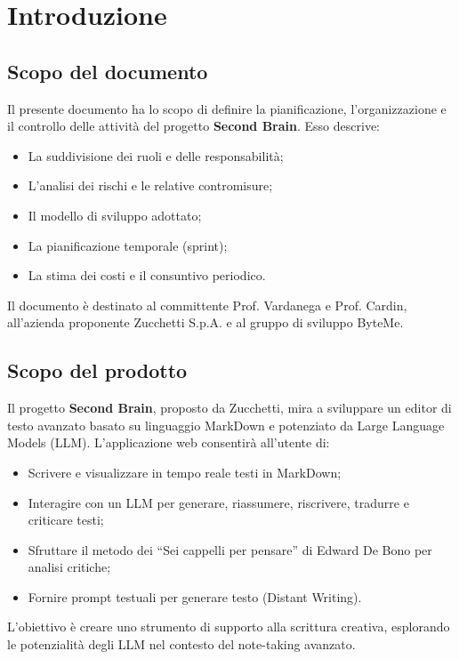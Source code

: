 \documentclass[11pt,a4paper]{article}
\begin{document}
\newpage

\tableofcontents
\thispagestyle{empty}
\newpage

\setcounter{page}{1}

\section{Introduzione}
\subsection{Scopo del documento}
Il presente documento ha lo scopo di definire la pianificazione, l’organizzazione e il controllo delle attività del progetto \textbf{Second Brain}. Esso descrive:
\begin{itemize}
    \item La suddivisione dei ruoli e delle responsabilità;
    \item L’analisi dei rischi e le relative contromisure;
    \item Il modello di sviluppo adottato;
    \item La pianificazione temporale (sprint);
    \item La stima dei costi e il consuntivo periodico.
\end{itemize}
Il documento è destinato al committente Prof. Vardanega e Prof. Cardin, all'azienda proponente Zucchetti S.p.A. e al gruppo di sviluppo ByteMe.

\subsection{Scopo del prodotto}
Il progetto \textbf{Second Brain}, proposto da Zucchetti, mira a sviluppare un editor di testo avanzato basato su linguaggio MarkDown e potenziato da Large Language Models (LLM). L’applicazione web consentirà all’utente di:
\begin{itemize}
    \item Scrivere e visualizzare in tempo reale testi in MarkDown;
    \item Interagire con un LLM per generare, riassumere, riscrivere, tradurre e criticare testi;
    \item Sfruttare il metodo dei “Sei cappelli per pensare” di Edward De Bono per analisi critiche;
    \item Fornire prompt testuali per generare testo (Distant Writing).
\end{itemize}
L’obiettivo è creare uno strumento di supporto alla scrittura creativa, esplorando le potenzialità degli LLM nel contesto del note-taking avanzato.
\end{document}
